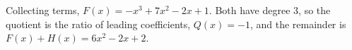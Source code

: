 Collecting terms, $F(x)=-x^3+7x^2-2x+1$. Both have degree $3$, so the quotient is the ratio of leading coefficients, $Q(x)=\boxed{-1}$, and the remainder is $F(x)+H(x)=\boxed{6x^2-2x+2}$.
